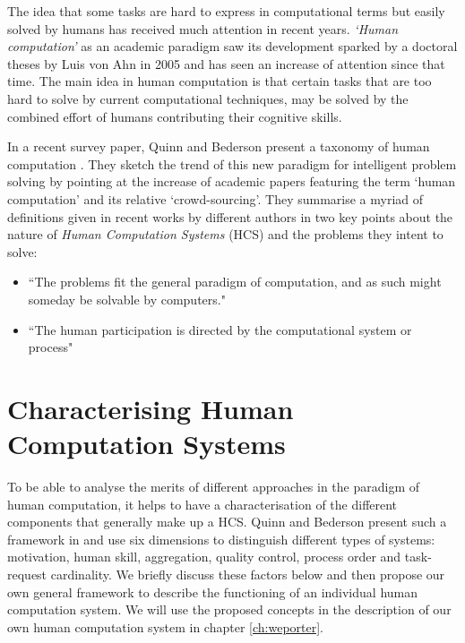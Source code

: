 The idea that some tasks are hard to express in computational terms but easily solved by humans has received much attention in recent years. \emph{`Human computation'} as an academic paradigm saw its development sparked by a doctoral theses by Luis von Ahn in 2005 and has seen an increase of attention since that time\cite{Quinn:2011us}. The main idea in human computation is that certain tasks that are too hard to solve by current computational techniques, may be solved by the combined effort of humans contributing their cognitive skills. 

In a recent survey paper, Quinn and Bederson present a taxonomy of human computation \cite{Quinn:2011us}. They sketch the trend of this new paradigm for intelligent problem solving by pointing at the increase of academic papers featuring the term `human computation' and its relative `crowd-sourcing'. They summarise a myriad of definitions given in recent works by different authors in two key points about the nature of \emph{Human Computation Systems} (HCS) and the problems they intent to solve:

\begin{itemize}
  \item ``The problems fit the general paradigm of computation, and as such might someday be solvable by computers."
  \item ``The human participation is directed by the computational system or process"
\end{itemize}




\section{Characterising Human Computation Systems} %
\label{sec:characterising_hcs}

To be able to analyse the merits of different approaches in the paradigm of human computation, it helps to have a characterisation of the different components that generally make up a HCS. Quinn and Bederson present such a framework in \cite{Quinn:2011us} and use six dimensions to distinguish different types of systems: motivation, human skill, aggregation, quality control, process order and task-request cardinality. We briefly discuss these factors below and then propose our own general framework to describe the functioning of an individual human computation system. We will use the proposed concepts in the description of our own human computation system in chapter \ref{ch:weporter}.

